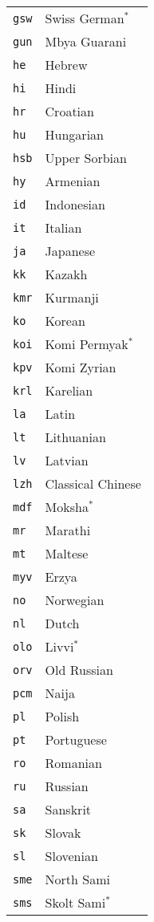 \begin{longtable}{|l|l|}
\texttt{gsw} & Swiss German\(^{*}\) \\
\texttt{gun} & Mbya Guarani \\
\texttt{he} & Hebrew \\
\texttt{hi} & Hindi \\
\texttt{hr} & Croatian \\
\texttt{hu} & Hungarian \\
\texttt{hsb} & Upper Sorbian \\
\texttt{hy} & Armenian \\
\texttt{id} & Indonesian \\
\texttt{it} & Italian \\
\texttt{ja} & Japanese \\
\texttt{kk} & Kazakh \\
\texttt{kmr} & Kurmanji \\
\texttt{ko} & Korean \\
\texttt{koi} & Komi Permyak\(^{*}\) \\
\texttt{kpv} & Komi Zyrian \\
\texttt{krl} & Karelian \\
\texttt{la} & Latin \\
\texttt{lt} & Lithuanian \\
\texttt{lv} & Latvian \\
\texttt{lzh} & Classical Chinese \\
\texttt{mdf} & Moksha\(^{*}\) \\
\texttt{mr} & Marathi \\
\texttt{mt} & Maltese \\
\texttt{myv} & Erzya \\
\texttt{no} & Norwegian \\
\texttt{nl} & Dutch \\
\texttt{olo} & Livvi\(^{*}\) \\
\texttt{orv} & Old Russian \\
\texttt{pcm} & Naija \\
\texttt{pl} & Polish \\
\texttt{pt} & Portuguese \\
\texttt{ro} & Romanian \\
\texttt{ru} & Russian \\
\texttt{sa} & Sanskrit \\
\texttt{sk} & Slovak \\
\texttt{sl} & Slovenian \\
\texttt{sme} & North Sami \\
\texttt{sms} & Skolt Sami\(^{*}\) \\

\end{longtable}
